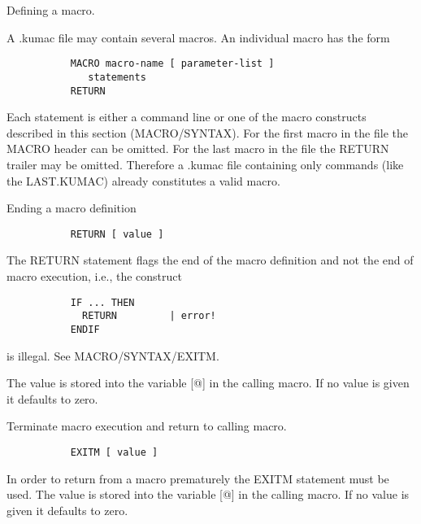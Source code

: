 \fi


   \par
Defining a macro.  

   \par
A .kumac file may contain several macros.  An individual macro has the form 

\begin{verbatim}
           MACRO macro-name [ parameter-list ]
              statements
           RETURN
\end{verbatim}
\ENDVERB
   \par
Each statement is either a command line or one of the macro constructs 
   described in this section (MACRO/SYNTAX).  For the first macro in the file 
   the MACRO header can be omitted.  For the last macro in the file the RETURN 
   trailer may be omitted.  Therefore a .kumac file containing only commands 
   (like the LAST.KUMAC) already constitutes a valid macro.  

\ENDCMD


   \par
Ending a macro definition 

\begin{verbatim}
           RETURN [ value ]
\end{verbatim}
   \par
The RETURN statement flags the end of the macro definition and not the end 
   of macro execution, i.e., the construct 

\begin{verbatim}
           IF ... THEN
             RETURN         | error!
           ENDIF
\end{verbatim}
\ENDVERB
   \par
is illegal.  See MACRO/SYNTAX/EXITM.  

   \par
The value is stored into the variable [@] in the calling macro. If no value 
   is given it defaults to zero.  

\ENDCMD


   \par
Terminate macro execution and return to calling macro.  

\begin{verbatim}
           EXITM [ value ]
\end{verbatim}
\ENDVERB
   \par
In order to return from a macro prematurely the EXITM statement must be 
   used.  The value is stored into the variable [@] in the calling macro. If 
   no value is given it defaults to zero.  

